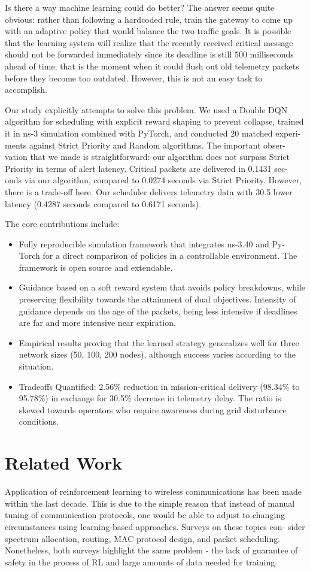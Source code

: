 \documentclass[runningheads,a4paper]{llncs}
\begin{document}
Is there a way machine learning could do better? The answer seems quite
obvious: rather than following a hardcoded rule, train the gateway to come up
with an adaptive policy that would balance the two traffic goals. It is possible
that the learning system will realize that the recently received critical message
should not be forwarded immediately since its deadline is still 500 milliseconds
ahead of time, that is the moment when it could flush out old telemetry packets
before they become too outdated. However, this is not an easy task to accomplish.

Our study explicitly attempts to solve this problem. We used a Double DQN
algorithm for scheduling with explicit reward shaping to prevent collapse, trained it
in ns-3 simulation combined with PyTorch, and conducted 20 matched experi-
ments against Strict Priority and Random algorithms. The important obser-
vation that we made is straightforward: our algorithm does not surpass Strict
Priority in terms of alert latency. Critical packets are delivered in 0.1431 sec-
onds via our algorithm, compared to 0.0274 seconds via Strict Priority. However,
there is a trade-off here. Our scheduler delivers telemetry data with 30.5%
lower latency (0.4287 seconds compared to 0.6171 seconds).

The core contributions include:
\begin{itemize}
    \item Fully reproducible simulation framework that integrates ns-3.40 and Py-
Torch for a direct comparison of policies in a controllable environment. The
framework is open source and extendable.
    \item Guidance based on a soft reward system that avoids policy breakdowns, while
preserving flexibility towards the attainment of dual objectives. Intensity of
guidance depends on the age of the packets, being less intensive if deadlines
are far and more intensive near expiration.
    \item Empirical results proving that the learned strategy generalizes well for three
network sizes (50, 100, 200 nodes), although success varies according to the
situation.
    \item Tradeoffs Quantified: 2.56\% reduction in mission-critical delivery (98.34\%
to 95.78\%) in exchange for 30.5\% decrease in telemetry delay. The ratio is
skewed towards operators who require awareness during grid disturbance
conditions.
\end{itemize}

\section{Related Work}
Application of reinforcement learning to wireless communications has been made
within the last decade. This is due to the simple reason that instead of manual
tuning of communication protocols, one would be able to adjust to changing
circumstances using learning-based approaches. Surveys \cite{frikha2021wrlsurvey,luong2019drlsurvey} on these topics con-
sider spectrum allocation, routing, MAC protocol design, and packet scheduling.
Nonetheless, both surveys highlight the same problem - the lack of guarantee of
safety in the process of RL and large amounts of data needed for training.
\end{document}
